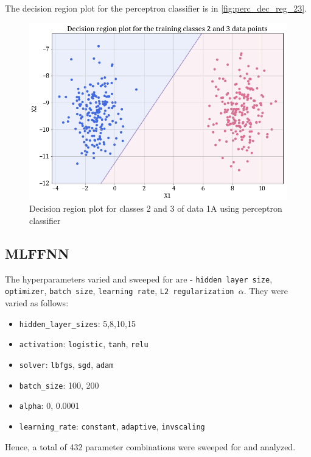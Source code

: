 \documentclass[11pt,a4paper]{article}
\newcommand{\noi}{\noindent}
\def\tt#1{\texttt{#1}}
\begin{document}
\noi
The decision region plot for the perceptron classifier is in \autoref{fig:perc_dec_reg_23}.
\begin{figure}[H]
    \centering
    \includegraphics[scale = 0.45]{images/1A_perceptron_training_classes_2_and_3_dec_reg.png}
    \caption{Decision region plot for classes 2 and 3 of data 1A using perceptron classifier}
    \label{fig:perc_dec_reg_23}
\end{figure}

\subsection{MLFFNN}
The hyperparameters varied and sweeped for are - \tt{hidden layer size}, \tt{optimizer}, \tt{batch size}, \tt{learning rate}, \tt{L2 regularization $\alpha$}. They were varied as follows:
\begin{itemize}
    \itemsep0em
    \item \tt{hidden\_layer\_sizes}: 5,8,10,15
    \item \tt{activation}: \tt{logistic}, \tt{tanh}, \tt{relu}
    \item \tt{solver}: \tt{lbfgs}, \tt{sgd}, \tt{adam}
    \item \tt{batch\_size}: 100, 200
    \item \tt{alpha}: 0, 0.0001
    \item \tt{learning\_rate}: \tt{constant}, \tt{adaptive}, \tt{invscaling}
\end{itemize}

\noi
Hence, a total of 432 parameter combinations were sweeped for and analyzed.
\end{document}
